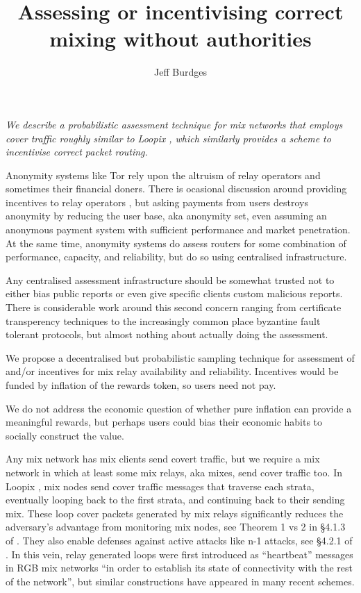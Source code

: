﻿\documentclass{sig-alternate-hotpets}
\title{Assessing or incentivising correct mixing without authorities} %
\author{Jeff Burdges}
\date{}
\begin{document}
\maketitle

\begin{adjustwidth}{6pt}{8pt}
\it
We describe a probabilistic assessment technique for %
mix networks that employs cover traffic roughly similar to
Loopix \cite{Loopix}, which similarly provides a scheme to
incentivise correct packet routing.
\end{adjustwidth}
\medskip

Anonymity systems like Tor %
rely upon the altruism of relay operators and sometimes their financial doners.
There is ocasional discussion around providing incentives to relay operators \cite{TorPathToTorCoin}, 
but asking payments from users destroys anonymity by reducing the user base, aka anonymity set, even assuming an anonymous payment system with sufficient performance and market penetration.  
At the same time, anonymity systems do assess routers for some combination of performance, capacity, and reliability, but do so using centralised infrastructure. 

Any centralised assessment infrastructure should be somewhat trusted not to either bias public reports or even give specific clients custom malicious reports.  There is considerable work around this second concern ranging from certificate transperency techniques to the increasingly common place byzantine fault tolerant protocols, but almost nothing about actually doing the assessment.

We propose a decentralised but probabilistic sampling technique for assessment of and/or incentives for mix relay availability and reliability.  
Incentives would be funded by inflation of the rewards token, so users need not pay.

We do not address the economic question of whether pure inflation can provide a meaningful rewards, but perhaps users could bias their economic habits to socially construct the value.

\smallskip

Any mix network has mix clients send covert traffic, but we require a mix network in which at least some mix relays, aka mixes, send cover traffic too.  
In Loopix \cite{Loopix}, mix nodes send cover traffic messages that traverse each strata, eventually looping back to the first strata, and continuing back to their sending mix.  
These loop cover packets generated by mix relays significantly reduces the adversary's advantage from monitoring mix nodes, see Theorem 1 vs 2 in \S4.1.3 of \cite{Loopix}.  %
They also enable defenses against active attacks like n-1 attacks, see \S4.2.1 of \cite{Loopix}.  %
In this vein, relay generated loops were first introduced as ``heartbeat'' messages in RGB mix networks \cite{RGB_Heartbeat} ``in order to establish its state of connectivity with the rest of the network'', but similar constructions have appeared in many recent schemes.
\end{document}
